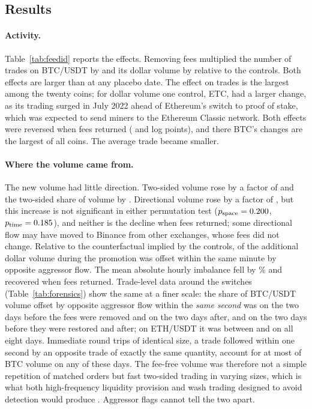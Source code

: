 \subsection{Results}

\paragraph{Activity.} Table~\ref{tab:feedid} reports the effects. Removing fees multiplied the number
of trades on BTC/USDT by \feeOnTradesX{} and its dollar volume by \feeOnDvolX{} relative to the
controls. Both effects are larger than at any placebo date. The effect on trades is the largest among
the twenty coins; for dollar volume one control, ETC, had a larger change, as its trading surged in
July 2022 ahead of Ethereum's switch to proof of stake, which was expected to send miners to the
Ethereum Classic network. Both effects were reversed when fees returned (\feeOffTrades{} and
\feeOffDvol{} log points), and there BTC's changes are the largest of all coins. The average trade
became smaller.

\paragraph{Where the volume came from.} The new volume had little direction. Two-sided volume rose by
a factor of \feeOnTwoX{} and the two-sided share of volume by \feeOnShare. Directional volume rose by a
factor of \feeOnNetX, but this increase is not significant in either permutation test
($p_{\text{space}}=0.200$, $p_{\text{time}}=0.185$), and neither is the decline when fees
returned; some directional flow may have moved to Binance from other exchanges, whose fees did not
change. Relative to the counterfactual implied by the controls, \feeExcessTwoShare{} of the
additional dollar volume during the promotion was offset within the same minute by opposite aggressor
flow. The mean absolute hourly imbalance fell by
\feeOnImbPctA\% and recovered when fees returned. Trade-level data around the switches
(Table~\ref{tab:forensics}) show the same at a finer scale: the share of BTC/USDT volume offset by
opposite aggressor flow within the \emph{same second} was \tfBtcTwoSecA{} on the two days before the
fees were removed and \tfBtcTwoSecB{} on the two days after, and \tfBtcTwoSecC{} on the two days
before they were restored and \tfBtcTwoSecD{} after; on ETH/USDT it was between \tfEthTwoSecMin{} and
\tfEthTwoSecMax{} on all eight days. Immediate round trips of identical size, a trade followed within
one second by an opposite trade of exactly the same quantity, account for at most \tfBtcPingVolMax{}
of BTC volume on any of these days. The fee-free volume was therefore not a simple repetition of
matched orders but fast two-sided trading in varying sizes, which is what both high-frequency
liquidity provision and wash trading designed to avoid detection would produce
\citep{cong2023,aloosh2024}. Aggressor flags cannot tell the two apart.

